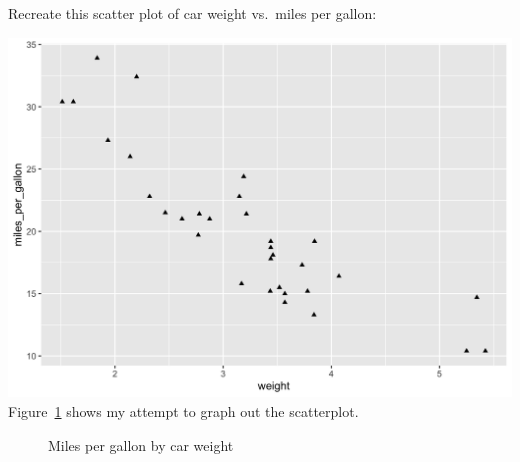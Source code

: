\documentclass[
  man,
  floatsintext,
  longtable,
  nolmodern,
  notxfonts,
  notimes,
  colorlinks=true,linkcolor=blue,citecolor=blue,urlcolor=blue]{apa7}
\begin{document}
Recreate this scatter plot of car weight vs.~miles per gallon:

\includegraphics{plots/plot3.png} Figure~\ref{fig-plot3-scatterplot}
shows my attempt to graph out the scatterplot.

\begin{figure}[H]

\caption{\label{fig-plot3-scatterplot}Miles per gallon by car weight}


\end{figure}%
\end{document}
